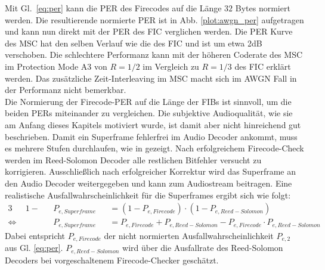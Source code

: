 Mit Gl.~\ref{eq:per} kann die PER des Firecodes auf die Länge $32$ Bytes normiert werden. Die resultierende normierte PER ist in Abb. \ref{plot:awgn_per} aufgetragen und kann nun direkt mit der PER des FIC verglichen werden. Die PER Kurve des MSC hat den selben Verlauf wie die des FIC und ist um etwa 2dB verschoben. Die schlechtere Performanz kann mit der höheren Coderate des MSC im Protection Mode A3 von $R=1/2$ im Vergleich zu $R=1/3$ des FIC erklärt werden. Das zusätzliche Zeit-Interleaving im MSC macht sich im AWGN Fall in der Performanz nicht bemerkbar.\\
Die Normierung der Firecode-PER auf die Länge der FIBs ist sinnvoll, um die beiden PERs miteinander zu vergleichen. Die subjektive Audioqualität, wie sie am Anfang dieses Kapitels motiviert wurde, ist damit aber nicht hinreichend gut beschrieben. Damit ein Superframe fehlerfrei im Audio Decoder ankommt, muss es mehrere Stufen durchlaufen, wie in  gezeigt. Nach erfolgreichem Firecode-Check werden im Reed-Solomon Decoder alle restlichen Bitfehler versucht zu korrigieren. Ausschließlich nach erfolgreicher Korrektur wird das Superframe an den Audio Decoder weitergegeben und kann zum Audiostream beitragen. Eine realistische Ausfallwahrscheinlichkeit für die Superframes ergibt sich wie folgt:
\begin{alignat}{3}
&1-&&P_{e,Superframe} &&= (1-P_{e,Firecode}) \cdot (1-P_{e, Reed-Solomon})\nonumber \\
\Leftrightarrow\; & &&P_{e, Superframe} &&= P_{e,Firecode} + P_{e, Reed-Solomon} - P_{e,Firecode}\cdot P_{e, Reed-Solomon}
\label{eq:per_superframe}
\end{alignat}
Dabei entspricht $P_{e,Firecode}$ der nicht normierten Ausfallwahrscheinlichkeit $P_{e,2}$ aus Gl. \ref{eq:per}. $P_{e,Reed-Solomon}$ wird über die Ausfallrate des Reed-Solomon Decoders bei vorgeschaltenem Firecode-Checker geschätzt.

